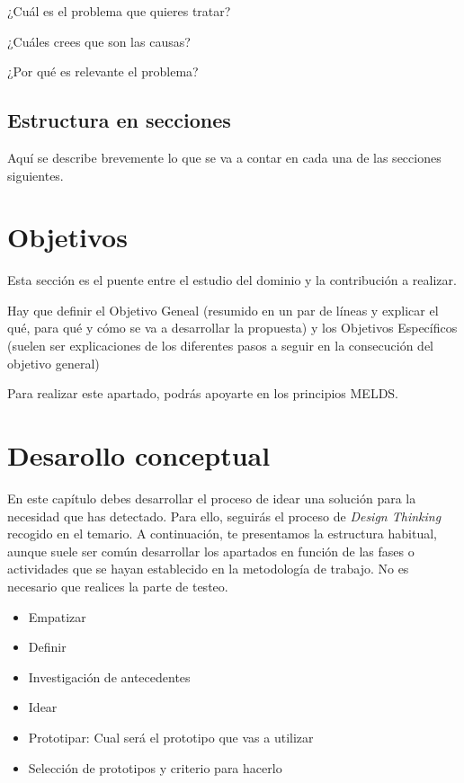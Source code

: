 \documentclass[12pt,a4paper]{articuloAPA}
\begin{document}
¿Cuál es el problema que quieres tratar?

¿Cuáles crees que son las causas?

¿Por qué es relevante el problema?


\subsection{Estructura en secciones}

Aquí se describe brevemente lo que se va a contar en cada una de las secciones siguientes.

\section{Objetivos}

Esta sección es el puente entre el estudio del dominio y la contribución a realizar. 

Hay que definir el Objetivo Geneal (resumido en un par de líneas y explicar el qué, para qué y cómo se va a desarrollar la propuesta) y los Objetivos Específicos (suelen ser explicaciones de los diferentes pasos a seguir en la consecución del objetivo general)

Para realizar este apartado, podrás apoyarte en los principios MELDS.


\section{Desarollo conceptual}


En este capítulo debes desarrollar el proceso de idear una solución para la necesidad que has detectado. Para ello, seguirás el proceso de \textit{Design Thinking} recogido en el temario. A continuación, te presentamos la estructura habitual, aunque suele ser común desarrollar los apartados en función de las fases o actividades que se hayan establecido en la metodología de trabajo. No es necesario que realices la parte de testeo.

\begin{itemize}
  \item Empatizar
  \item Definir
  \item Investigación de antecedentes
  \item Idear
  \item Prototipar: Cual será el prototipo que vas a utilizar
  \item Selección de prototipos y criterio para hacerlo  
\end{itemize}
\end{document}
